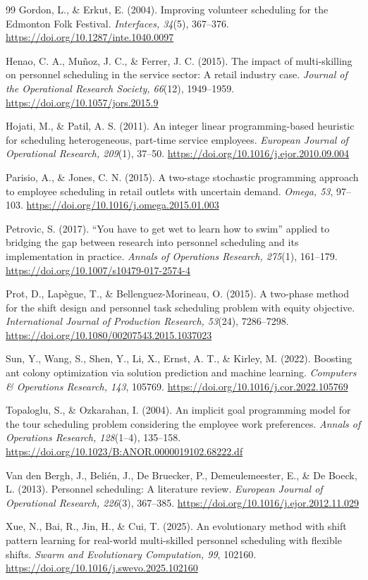 \documentclass[12pt]{article}
\begin{document}
\begin{thebibliography}{99}
Gordon, L., \& Erkut, E. (2004).
Improving volunteer scheduling for the Edmonton Folk Festival.
\textit{Interfaces, 34}(5), 367--376.
\url{https://doi.org/10.1287/inte.1040.0097}

Henao, C. A., Mu\~noz, J. C., \& Ferrer, J. C. (2015).
The impact of multi-skilling on personnel scheduling in the service sector: A retail industry case.
\textit{Journal of the Operational Research Society, 66}(12), 1949--1959.
\url{https://doi.org/10.1057/jors.2015.9}

Hojati, M., \& Patil, A. S. (2011).
An integer linear programming-based heuristic for scheduling heterogeneous, part-time service employees.
\textit{European Journal of Operational Research, 209}(1), 37--50.
\url{https://doi.org/10.1016/j.ejor.2010.09.004}

Parisio, A., \& Jones, C. N. (2015).
A two-stage stochastic programming approach to employee scheduling in retail outlets with uncertain demand.
\textit{Omega, 53}, 97--103.
\url{https://doi.org/10.1016/j.omega.2015.01.003}

Petrovic, S. (2017).
``You have to get wet to learn how to swim'' applied to bridging the gap between research into personnel scheduling and its implementation in practice.
\textit{Annals of Operations Research, 275}(1), 161--179.
\url{https://doi.org/10.1007/s10479-017-2574-4}

Prot, D., Lap\`egue, T., \& Bellenguez-Morineau, O. (2015).
A two-phase method for the shift design and personnel task scheduling problem with equity objective.
\textit{International Journal of Production Research, 53}(24), 7286--7298.
\url{https://doi.org/10.1080/00207543.2015.1037023}

Sun, Y., Wang, S., Shen, Y., Li, X., Ernst, A. T., \& Kirley, M. (2022).
Boosting ant colony optimization via solution prediction and machine learning.
\textit{Computers \& Operations Research, 143}, 105769.
\url{https://doi.org/10.1016/j.cor.2022.105769}

Topaloglu, S., \& Ozkarahan, I. (2004).
An implicit goal programming model for the tour scheduling problem considering the employee work preferences.
\textit{Annals of Operations Research, 128}(1--4), 135--158.
\url{https://doi.org/10.1023/B:ANOR.0000019102.68222.df}

Van den Bergh, J., Beli\'en, J., De Bruecker, P., Demeulemeester, E., \& De Boeck, L. (2013).
Personnel scheduling: A literature review.
\textit{European Journal of Operational Research, 226}(3), 367--385.
\url{https://doi.org/10.1016/j.ejor.2012.11.029}

Xue, N., Bai, R., Jin, H., \& Cui, T. (2025).
An evolutionary method with shift pattern learning for real-world multi-skilled personnel scheduling with flexible shifts.
\textit{Swarm and Evolutionary Computation, 99}, 102160.
\url{https://doi.org/10.1016/j.swevo.2025.102160}

\end{thebibliography}
\end{document}
